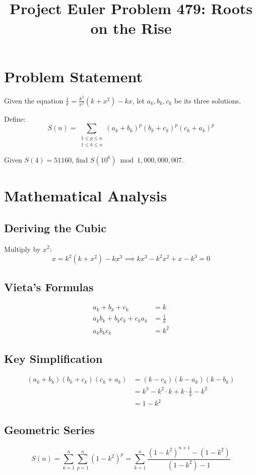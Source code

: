 \documentclass[12pt]{article}
\title{Project Euler Problem 479: Roots on the Rise}
\author{}
\date{}
\begin{document}
\maketitle

\section{Problem Statement}
Given the equation $\frac{1}{x} = \frac{k^2}{x^2}(k + x^2) - kx$, let $a_k, b_k, c_k$ be its three solutions.

Define:
\[
S(n) = \sum_{\substack{1 \le p \le n \\ 1 \le k \le n}} (a_k+b_k)^p (b_k+c_k)^p (c_k+a_k)^p
\]

Given $S(4) = 51160$, find $S(10^6) \bmod 1{,}000{,}000{,}007$.

\section{Mathematical Analysis}

\subsection{Deriving the Cubic}
Multiply by $x^2$:
\[
x = k^2(k + x^2) - kx^3 \implies kx^3 - k^2 x^2 + x - k^3 = 0
\]

\subsection{Vieta's Formulas}
\begin{align}
a_k + b_k + c_k &= k \\
a_k b_k + b_k c_k + c_k a_k &= \frac{1}{k} \\
a_k b_k c_k &= k^2
\end{align}

\subsection{Key Simplification}
\begin{align}
(a_k+b_k)(b_k+c_k)(c_k+a_k) &= (k - c_k)(k - a_k)(k - b_k) \\
&= k^3 - k^2 \cdot k + k \cdot \frac{1}{k} - k^2 \\
&= 1 - k^2
\end{align}

\subsection{Geometric Series}
\[
S(n) = \sum_{k=1}^{n} \sum_{p=1}^{n} (1-k^2)^p = \sum_{k=1}^{n} \frac{(1-k^2)^{n+1} - (1-k^2)}{(1-k^2) - 1}
\]
\end{document}
